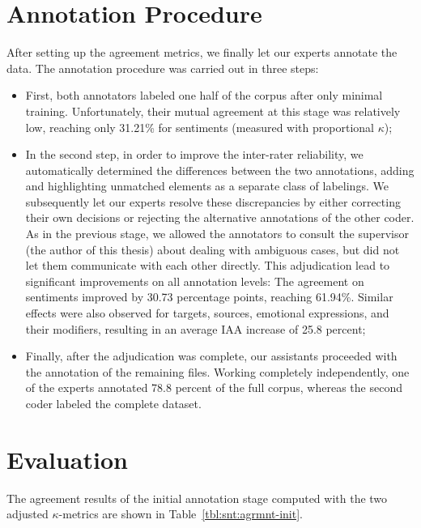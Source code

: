 \section{Annotation Procedure}\label{sec:astages}
After setting up the agreement metrics, we finally let our experts
annotate the data.  The annotation procedure was carried out in three
steps:
\begin{itemize}
  \item First, both annotators labeled one half of the corpus after
    only minimal training.  Unfortunately, their mutual agreement at
    this stage was relatively low, reaching only 31.21\% for
    sentiments (measured with proportional $\kappa$);
  \item In the second step, in order to improve the inter-rater
    reliability, we automatically determined the differences between
    the two annotations, adding and highlighting unmatched elements as
    a separate class of labelings. We subsequently let our experts
    resolve these discrepancies by either correcting their own
    decisions or rejecting the alternative annotations of the other
    coder.  As in the previous stage, we allowed the annotators to
    consult the supervisor (the author of this thesis) about dealing
    with ambiguous cases, but did not let them communicate with each
    other directly.  This adjudication lead to significant
    improvements on all annotation levels: The agreement on sentiments
    improved by 30.73 percentage points, reaching 61.94\%.  Similar
    effects were also observed for targets, sources, emotional
    expressions, and their modifiers, resulting in an average IAA
    increase of 25.8 percent;
  \item Finally, after the adjudication was complete, our assistants
    proceeded with the annotation of the remaining files.  Working
    completely independently, one of the experts annotated 78.8
    percent of the full corpus, whereas the second coder labeled the
    complete dataset.
\end{itemize}

\section{Evaluation}\label{sec:eval}
The agreement results of the initial annotation stage computed with
the two adjusted $\kappa$-metrics are shown in
Table~\ref{tbl:snt:agrmnt-init}.

